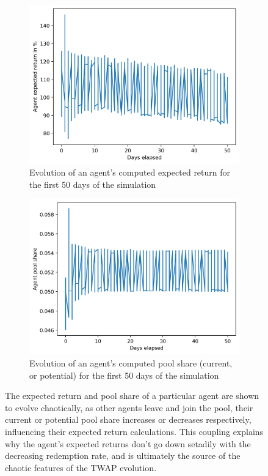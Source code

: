 \documentclass{article}
\begin{document}
    \begin{figure}
      \captionsetup[subfigure]{position=b}
      \centering
      \begin{subfigure}[t]{.5\textwidth}
        \centering
        \captionsetup{margin=1.1cm}
        \includegraphics[width=1\linewidth]{figures/agent-return 2021-03-10 15-25-52.png}
        \caption{Evolution of an agent's computed expected return for the first 50 days of the simulation}
      \end{subfigure}%
      \begin{subfigure}[t]{.5\textwidth}
        \centering
        \captionsetup{margin=1.1cm}
        \includegraphics[width=1\linewidth]{figures/agent-pool-share 2021-03-10 15-25-52.png}
        \caption{Evolution of an agent's computed pool share (current, or potential) for the first 50 days of the simulation}
      \end{subfigure}
      \caption{The expected return and pool share of a particular agent are shown to evolve chaotically, as other agents leave and join the pool, their current or potential pool share increases or decreases respectively, influencing their expected return calculations. This coupling explains why the agent's expected returns don't go down setadily with the decreasing redemption rate, and is ultimately the source of the chaotic features of the TWAP evolution.}
    \end{figure}
\end{document}
